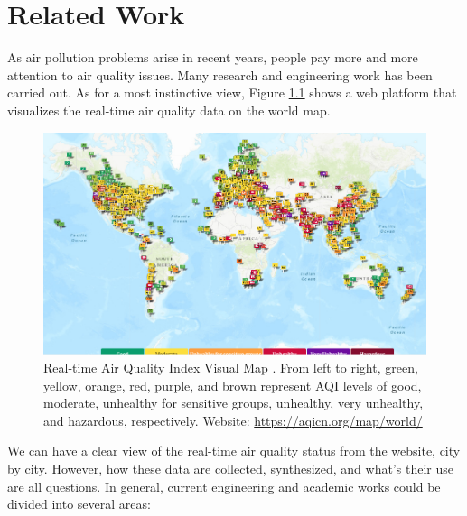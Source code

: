 \chapter{Related Work}\label{chap:related_work}

As air pollution problems arise in recent years, people pay more and more attention to air quality issues. Many research and engineering work has been carried out. As for a most instinctive view, Figure \ref{fig:aqi_map}  shows a web platform that visualizes the real-time air quality data on the world map.

\begin{figure}[!htbp]
    \centering
    \includegraphics[width=0.7\linewidth]{fig/air-pollution-map-Screenshot-2021-08-11-020331.png}
    \caption{Real-time Air Quality Index Visual Map \cite{aqi_map}. From left to right, green, yellow, orange, red, purple, and brown represent AQI levels of good, moderate, unhealthy for sensitive groups, unhealthy, very unhealthy, and hazardous, respectively. Website: \href{https://aqicn.org/map/world/}{https://aqicn.org/map/world/}}
    \label{fig:aqi_map}
\end{figure}

We can have a clear view of the real-time air quality status from the website, city by city. However, how these data are collected, synthesized, and what's their use are all questions. In general, current engineering and academic works could be divided into several areas:

